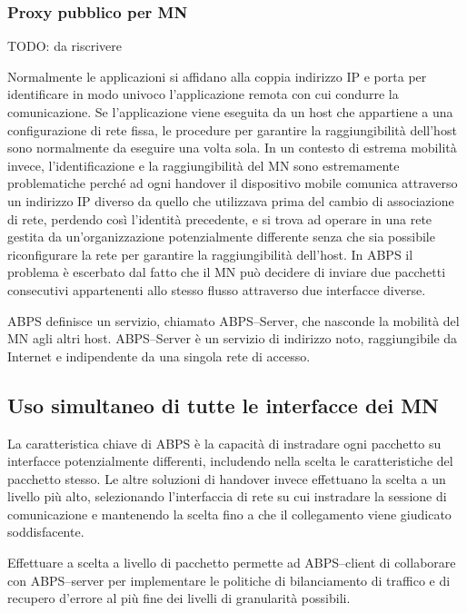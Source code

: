 \documentclass[12pt,a4paper,openright,twoside]{book}
\begin{document}
\subsubsection{Proxy pubblico per MN}
TODO: da riscrivere

Normalmente le applicazioni si affidano alla coppia indirizzo IP e
porta per identificare in modo univoco l'applicazione remota con cui
condurre la comunicazione. Se l'applicazione viene eseguita da un host
che appartiene a una configurazione di rete fissa, le procedure per
garantire la raggiungibilità dell'host sono normalmente da eseguire
una volta sola. In un contesto di estrema mobilità invece,
l'identificazione e la raggiungibilità del MN sono estremamente
problematiche perché ad ogni handover il dispositivo mobile comunica
attraverso un indirizzo IP diverso da quello che utilizzava prima del
cambio di associazione di rete, perdendo così l'identità precedente, e
si trova ad operare in una rete gestita da un'organizzazione
potenzialmente differente senza che sia possibile riconfigurare la
rete per garantire la raggiungibilità dell'host. In ABPS il problema è
escerbato dal fatto che il MN può decidere di inviare due pacchetti
consecutivi appartenenti allo stesso flusso attraverso due interfacce
diverse.

ABPS definisce un servizio, chiamato ABPS--Server, che nasconde la
mobilità del MN agli altri host. ABPS--Server è un servizio di
indirizzo noto, raggiungibile da Internet e indipendente da una
singola rete di accesso.

\subsection{Uso simultaneo di tutte le interfacce dei MN}
La caratteristica chiave di ABPS è la capacità di instradare ogni
pacchetto su interfacce potenzialmente differenti, includendo nella
scelta le caratteristiche del pacchetto stesso. Le altre soluzioni di
handover invece effettuano la scelta a un livello più alto,
selezionando l'interfaccia di rete su cui instradare la sessione di
comunicazione e mantenendo la scelta fino a che il collegamento viene
giudicato soddisfacente.

Effettuare a scelta a livello di pacchetto permette ad ABPS--client di
collaborare con ABPS--server per implementare le politiche di
bilanciamento di traffico e di recupero d'errore al più fine dei
livelli di granularità possibili.
\end{document}
